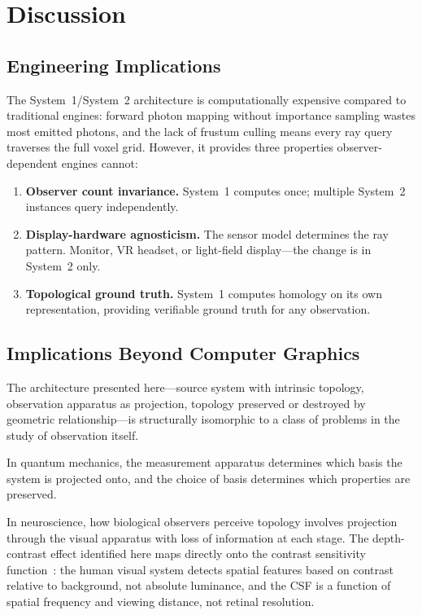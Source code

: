\documentclass[11pt,a4paper]{article}
\theoremstyle{remark}
\begin{document}
\section{Discussion}
\label{sec:discussion}

\subsection{Engineering Implications}

The System~1/System~2 architecture is computationally expensive compared to traditional engines: forward photon mapping without importance sampling wastes most emitted photons, and the lack of frustum culling means every ray query traverses the full voxel grid. However, it provides three properties observer-dependent engines cannot:

\begin{enumerate}[leftmargin=*]
    \item \textbf{Observer count invariance.} System~1 computes once; multiple System~2 instances query independently.
    \item \textbf{Display-hardware agnosticism.} The sensor model determines the ray pattern. Monitor, VR headset, or light-field display---the change is in System~2 only.
    \item \textbf{Topological ground truth.} System~1 computes homology on its own representation, providing verifiable ground truth for any observation.
\end{enumerate}

\subsection{Implications Beyond Computer Graphics}

The architecture presented here---source system with intrinsic topology, observation apparatus as projection, topology preserved or destroyed by geometric relationship---is structurally isomorphic to a class of problems in the study of observation itself.

In quantum mechanics, the measurement apparatus determines which basis the system is projected onto, and the choice of basis determines which properties are preserved.

In neuroscience, how biological observers perceive topology involves projection through the visual apparatus with loss of information at each stage. The depth-contrast effect identified here maps directly onto the contrast sensitivity function~\cite{campbell1968}: the human visual system detects spatial features based on contrast relative to background, not absolute luminance, and the CSF is a function of spatial frequency and viewing distance, not retinal resolution.
\end{document}
